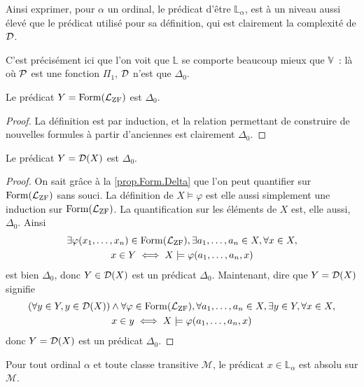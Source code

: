 Ainsi exprimer, pour $\alpha$ un ordinal, le prédicat d'être $\mathbb L_\alpha$,
est à un niveau aussi élevé que le prédicat utilisé pour sa définition, qui est
clairement la complexité de $\mathcal{D}$.

C'est précisément ici que l'on voit que $\mathbb L$ se comporte beaucoup mieux
que $\mathbb V$~: là où $\mathcal{P}$ est une fonction $\Pi_1$, $\mathcal{D}$ n'est
que $\Delta_0$.

\begin{property}\label{prop.Form.Delta}
  Le prédicat $Y = \operatorname{Form}(\mathcal L_{\operatorname{ZF}})$ est $\Delta_0$.
\end{property}

\begin{proof}
  La définition est par induction, et la relation permettant de construire
  de nouvelles formules à partir d'anciennes est clairement $\Delta_0$.
\end{proof}

\begin{property}
  Le prédicat $Y = \mathcal{D}(X)$ est $\Delta_0$.
\end{property}

\begin{proof}
  On sait grâce à la \cref{prop.Form.Delta} que l'on peut quantifier
  sur $\operatorname{Form}(\mathcal L_{\operatorname{ZF}})$ sans souci. La définition de
  $X\models \varphi$ est elle aussi simplement une induction sur
  $\operatorname{Form}(\mathcal L_{\operatorname{ZF}})$. La quantification sur les éléments de $X$ est,
  elle aussi, $\Delta_0$. Ainsi
  \begin{multline*}
    \exists \varphi(x_1,\ldots,x_n)\in\operatorname{Form}(\mathcal L_{\operatorname{ZF}}),
    \exists a_1,\ldots,a_n\in X, \forall x\in X, \\
    x\in Y \iff X\models \varphi(a_1,\ldots,a_n,x)
  \end{multline*}
  est bien $\Delta_0$, donc $Y\in \mathcal{D}(X)$ est un prédicat $\Delta_0$.
  Maintenant, dire que $Y = \mathcal{D}(X)$ signifie
  \begin{multline*}
    (\forall y \in Y, y \in \mathcal{D}(X)) \land
    \forall \varphi\in\operatorname{Form}(\mathcal L_{\operatorname{ZF}}),
    \forall a_1,\ldots,a_n\in X, \exists y \in Y, \forall x \in X,\\
    x \in y \iff X\models \varphi(a_1,\ldots,a_n,x)
  \end{multline*}
  donc $Y = \mathcal{D}(X)$ est un prédicat $\Delta_0$.
\end{proof}

\begin{corollary}
  Pour tout ordinal $\alpha$ et toute classe transitive $\mathcal M$, le
  prédicat $x\in \mathbb L_{\alpha}$ est absolu sur $\mathcal M$.
\end{corollary}

